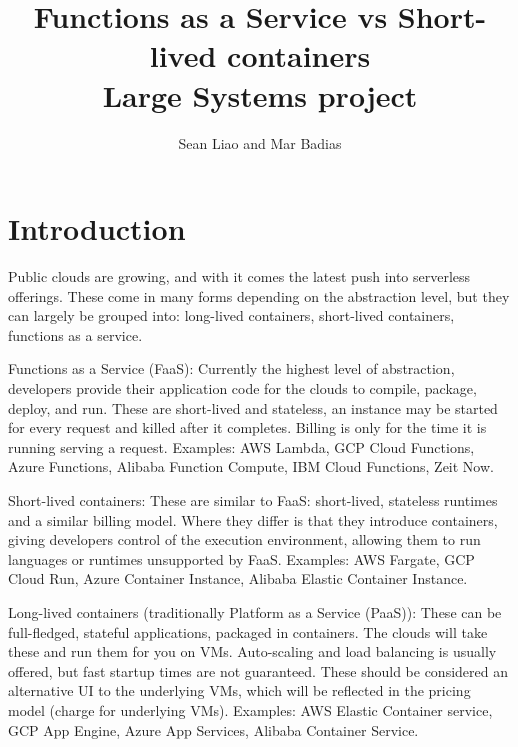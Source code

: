 \documentclass[11pt]{article}
\title{%
  Functions as a Service vs Short-lived containers \\
  \large Large Systems project}
\author{Sean Liao and Mar Badias}
\begin{document}
\maketitle



\section{Introduction}
Public clouds are growing, and with it comes the latest push into serverless offerings. These come in many forms depending on the abstraction level, but they can largely be grouped into: long-lived containers, short-lived containers, functions as a service.

Functions as a Service (FaaS): Currently the highest level of abstraction, developers provide their application code for the clouds to compile, package, deploy, and run. These are short-lived and stateless, an instance may be started for every request and killed after it completes. Billing is only for the time it is running serving a request. Examples: AWS Lambda, GCP Cloud Functions, Azure Functions, Alibaba Function Compute, IBM Cloud Functions, Zeit Now.

Short-lived containers: These are similar to FaaS: short-lived, stateless runtimes and a similar billing model. Where they differ is that they introduce containers, giving developers control of the execution environment, allowing them to run languages or runtimes unsupported by FaaS. Examples: AWS Fargate, GCP Cloud Run, Azure Container Instance, Alibaba Elastic Container Instance.

Long-lived containers (traditionally Platform as a Service (PaaS)): These can be full-fledged, stateful applications, packaged in containers. The clouds will take these and run them for you on VMs. Auto-scaling and load balancing is usually offered, but fast startup times are not guaranteed. These should be considered an alternative UI to the underlying VMs, which will be reflected in the pricing model (charge for underlying VMs). Examples: AWS Elastic Container service, GCP App Engine, Azure App Services, Alibaba Container Service.
\end{document}
